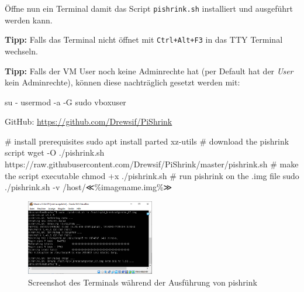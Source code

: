 \documentclass[
  11pt,
  a4paper,
  oneside, openany  ,captions=tableheading
]{scrbook}
\newenvironment{Shaded}{\begin{snugshade}}{\end{snugshade}}
\newcommand{\AttributeTok}[1]{\textcolor[rgb]{0.40,0.45,0.13}{#1}}
\newcommand{\CommentTok}[1]{\textcolor[rgb]{0.37,0.37,0.37}{#1}}
\newcommand{\ExtensionTok}[1]{\textcolor[rgb]{0.00,0.23,0.31}{#1}}
\newcommand{\FunctionTok}[1]{\textcolor[rgb]{0.28,0.35,0.67}{#1}}
\newcommand{\NormalTok}[1]{\textcolor[rgb]{0.00,0.23,0.31}{#1}}
\theoremstyle{remark}
\begin{document}
Öffne nun ein Terminal damit das Script \texttt{pishrink.sh} installiert
und ausgeführt werden kann.

\textbf{Tipp:} Falls das Terminal nicht öffnet mit \texttt{Ctrl+Alt+F3}
in das TTY Terminal wechseln.

\textbf{Tipp:} Falls der VM User noch keine Adminrechte hat (per Default
hat der \emph{User} kein Adminrechte), können diese nachträglich gesetzt
werden mit:

\begin{Shaded}
\begin{Highlighting}[]
\FunctionTok{su} \AttributeTok{{-}} 
\ExtensionTok{usermod} \AttributeTok{{-}a} \AttributeTok{{-}G}\NormalTok{ sudo vboxuser}
\end{Highlighting}
\end{Shaded}

GitHub: \url{https://github.com/Drewsif/PiShrink}

\begin{Shaded}
\begin{Highlighting}[]
\CommentTok{\# install prerequisites}
\FunctionTok{sudo}\NormalTok{ apt install parted xz{-}utils}
\CommentTok{\# download the pishrink script}
\FunctionTok{wget} \AttributeTok{{-}O}\NormalTok{ ./pishrink.sh https://raw.githubusercontent.com/Drewsif/PiShrink/master/pishrink.sh}
\CommentTok{\# make the script executable}
\FunctionTok{chmod}\NormalTok{ +x ./pishrink.sh}
\CommentTok{\# run pishrink on the .img file}
\FunctionTok{sudo}\NormalTok{ ./pishrink.sh }\AttributeTok{{-}v}\NormalTok{ /host/≪\%imagename.img\%≫}
\end{Highlighting}
\end{Shaded}

\begin{figure}[H]

{\centering \includegraphics[width=0.5\textwidth,height=\textheight]{images/raspberrypi_image_verkleinern_04.png}

}

\caption{Screenshot des Terminals während der Ausführung von pishrink}

\end{figure}%
\end{document}
